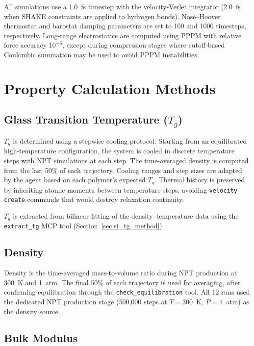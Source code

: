 \documentclass[journal=acsami,manuscript=suppinfo]{achemso}
\begin{document}
All simulations use a 1.0~fs timestep with the velocity-Verlet integrator (2.0~fs when SHAKE constraints are applied to hydrogen bonds).
Nos\'{e}--Hoover thermostat and barostat damping parameters are set to 100 and 1000 timesteps, respectively.
Long-range electrostatics are computed using PPPM with relative force accuracy $10^{-6}$, except during compression stages where cutoff-based Coulombic summation may be used to avoid PPPM instabilities.


\section{Property Calculation Methods}
\label{sec:si_property_methods}

\subsection{Glass Transition Temperature ($T_g$)}

$T_g$ is determined using a stepwise cooling protocol.\cite{trag2019gaff2mod,strobl2007physics}
Starting from an equilibrated high-temperature configuration, the system is cooled in discrete temperature steps with NPT simulations at each step.
The time-averaged density is computed from the last 50\% of each trajectory.
Cooling ranges and step sizes are adapted by the agent based on each polymer's expected $T_g$.
Thermal history is preserved by inheriting atomic momenta between temperature steps, avoiding \texttt{velocity create} commands that would destroy relaxation continuity.

$T_g$ is extracted from bilinear fitting of the density--temperature data using the \texttt{extract\_tg} MCP tool (Section~\ref{sec:si_tg_method}).

\subsection{Density}

Density is the time-averaged mass-to-volume ratio during NPT production at 300~K and 1~atm.
The final 50\% of each trajectory is used for averaging, after confirming equilibration through the \texttt{check\_equilibration} tool.
All 12 runs used the dedicated NPT production stage (500{,}000 steps at $T = 300$~K, $P = 1$~atm) as the density source.

\subsection{Bulk Modulus}
\end{document}
